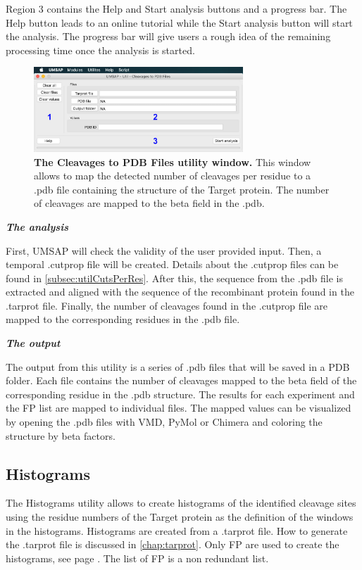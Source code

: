 Region \num{3} contains the Help and Start analysis buttons and a progress bar. The Help button leads to an online tutorial while the Start analysis button will start the analysis. The progress bar will give users a rough idea of the remaining processing time once the analysis is started.

\begin{figure}[h]
	\centering
	\includegraphics[width=0.7\textwidth]{./IMAGES/UTIL-PDB-WINDOW/util-pdb.jpg}	    
	\caption[The Cleavages to PDB Files utility window]{\textbf{The Cleavages to PDB Files utility window.} This window allows to map the detected number of cleavages per residue to a .pdb file containing the structure of the Target protein. The number of cleavages are mapped to the beta field in the .pdb.} 
	\label{fig:utilCut2PDB}
	\vspace{-5pt} 	
\end{figure}

\textit{\textbf{The analysis}}

First, UMSAP will check the validity of the user provided input. Then, a temporal .cutprop file will be created. Details about the .cutprop files can be found in \autoref{subsec:utilCutsPerRes}. After this, the sequence from the .pdb file is extracted and aligned with the sequence of the recombinant protein found in the .tarprot file. Finally, the number of cleavages found in the .cutprop file are mapped to the corresponding residues in the .pdb file.

\textit{\textbf{The output}}

The output from this utility is a series of .pdb files that will be saved in a PDB folder. Each file contains the number of cleavages mapped to the beta field of the corresponding residue in the .pdb structure. The results for each experiment and the FP list are mapped to individual files. The mapped values can be visualized by opening the .pdb files with VMD, PyMol or Chimera and coloring the structure by beta factors.

\subsection{Histograms}
\label{subsec:utilHistoCut}
The Histograms utility allows to create histograms of the identified cleavage sites using the residue numbers of the Target protein as the definition of the windows in the histograms. Histograms are created from a .tarprot file. How to generate the .tarprot file is discussed in \autoref{chap:tarprot}. Only FP are used to create the histograms, see page \pageref{par:tarprotPIP}. The list of FP is a non redundant list. 

